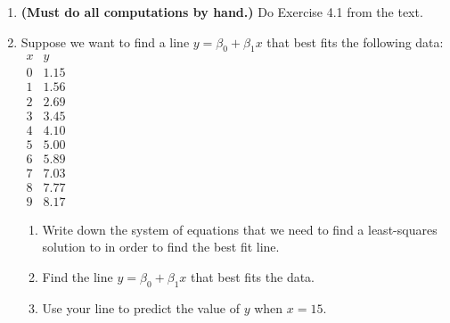 \documentclass{article}
\newcommand{\0}{\mathbf{0}}
\begin{document}
\begin{enumerate}
	\item \textbf{(Must do all computations by hand.)} Do Exercise 4.1 from the text.
	
	\item Suppose we want to find a line $y = \beta_0 + \beta_1x$ that best fits the following data:\qquad $\begin{array}{r|r}
	x & y\\
	\hline
	0 & 1.15\\
	1 & 1.56\\
	2 & 2.69\\
	3 & 3.45\\
	4 & 4.10\\
	5 & 5.00\\
	6 & 5.89\\
	7 & 7.03\\
	8 & 7.77\\
	9 & 8.17
	\end{array}$
	\begin{enumerate}
		\item Write down the system of equations that we need to find a least-squares solution to in order to find the best fit line.
		\item Find the line $y = \beta_0 + \beta_1x$ that best fits the data.
		\item Use your line to predict the value of $y$ when $x=15$.
	\end{enumerate}


\end{enumerate}
\end{document}
